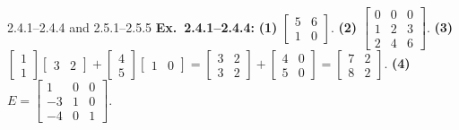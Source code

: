 \documentclass[11pt,a4paper,openany,oneside]{book}
\numberwithin{equation}{chapter}
\begin{document}
\vfill
\begin{pageend_sol}{2.4.1--2.4.4 and 2.5.1--2.5.5}
\textbf{Ex.\ 2.4.1--2.4.4:} \textbf{(1)} $\begin{bmatrix}5 & 6\\1 & 0\end{bmatrix}$. \textbf{(2)} $\begin{bmatrix}0 & 0 & 0\\1 & 2 & 3\\2 & 4 & 6\end{bmatrix}$. \textbf{(3)} $\begin{bmatrix}1\\1\end{bmatrix}\begin{bmatrix}3 & 2\end{bmatrix} + \begin{bmatrix}4\\5\end{bmatrix}\begin{bmatrix}1 & 0\end{bmatrix} = \begin{bmatrix}3 & 2\\3 & 2\end{bmatrix} + \begin{bmatrix}4 & 0\\5 & 0\end{bmatrix} = \begin{bmatrix}7 & 2\\8 & 2\end{bmatrix}$. \textbf{(4)} $E = \begin{bmatrix}1 & 0 & 0\\-3 & 1 & 0\\-4 & 0 & 1\end{bmatrix}$.


\end{pageend_sol}
\end{document}

